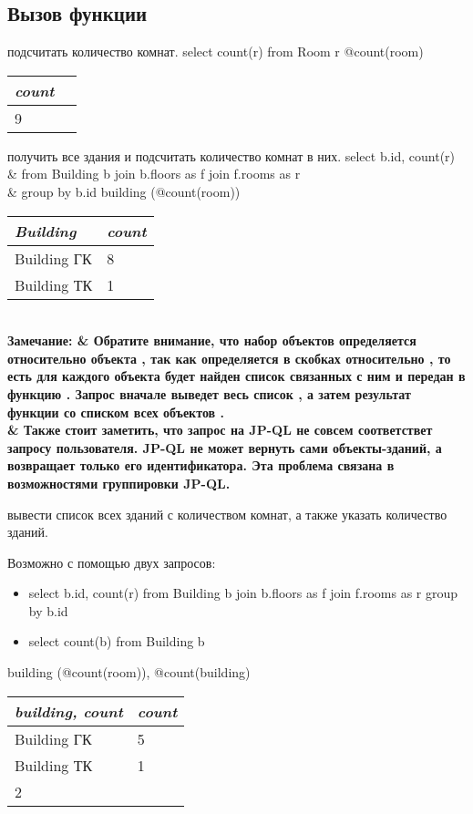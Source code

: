 \subsection{Вызов функции}
\exastable
    {подсчитать количество комнат.}
    {select count(r) from Room r}
    {@count(room)}
    {\begin{tabular}{|l|l|}
	\hline
	\it{count} \\[5pt]
	\hline
	\hline
	9\\
	\hline
    \end{tabular}}

\exastable
    {получить все здания и подсчитать количество комнат в них.}
    {select b.id, count(r) \\ 
	& \hspace{0.4cm} from Building b join b.floors as f join f.rooms as r \\
	& \hspace{0.4cm} group by b.id}
    {building (@count(room))}
    {\begin{tabular}{|l|l|}
	\hline
	\it{Building} & \it{count}\\[5pt]
	\hline
	\hline
	Building ГК & 8\\
	\hline
	Building ТК & 1\\
	\hline
    \end{tabular}\\[10pt]
    \bf{Замечание:} & Обратите внимание, что набор объектов  определяется относительно 
	объекта , так как  определяется в скобках относительно ,
	то есть для каждого объекта  будет найден список связанных с ним  и 
	передан в функцию .
	Запрос  вначале выведет весь список , а затем 
	результат функции со списком всех объектов .\\
	& Также стоит заметить, что запрос на JP-QL не совсем соответствет запросу пользователя. 
	JP-QL не может вернуть сами объекты-зданий, а возвращает только его идентификатора.
	Эта проблема связана в возможностями группировки JP-QL.}

\exastable
    {вывести список всех зданий с количеством комнат, а также указать количество зданий.}
    {Возможно с помощью двух запросов:
	\begin{itemize}\addtolength{\itemsep}{-0.7\baselineskip}
	    \item select b.id, count(r) 
	    from Building b join b.floors as f join f.rooms as r
	    group by b.id
	    \item select count(b) from Building b
	\end{itemize}
    }
    {building (@count(room)), @count(building)}
    {\begin{tabular}{|l|l|}
	\hline
	\it{building, count} & \it{count}\\[5pt]
	\hline
	\hline
	Building ГК & 5\\
	\hline
	Building ТК & 1\\
	\hline
	2 & \\
	\hline
    \end{tabular}}

